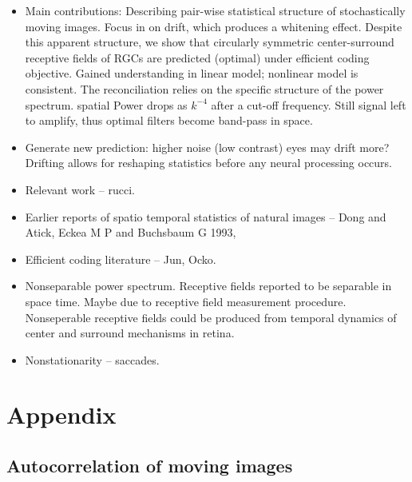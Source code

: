 \documentclass[12pt]{article}
\begin{document}
\begin{itemize}
    \item Main contributions: Describing pair-wise statistical structure of stochastically moving images. Focus in on drift, which produces a whitening effect. Despite this apparent structure, we show that circularly symmetric center-surround receptive fields of RGCs are predicted (optimal) under efficient coding objective. Gained understanding in linear model; nonlinear model is consistent. The reconciliation relies on the specific structure of the power spectrum. spatial Power drops as $k^{-4}$ after a cut-off frequency. Still signal left to amplify, thus optimal filters become band-pass in space. 
    \item Generate new prediction: higher noise (low contrast) eyes may drift more? Drifting allows for reshaping statistics before any neural processing occurs. 
    \item Relevant work -- rucci. 
    \item Earlier reports of spatio temporal statistics of natural images -- Dong and Atick, Eckea M P and Buchsbaum G 1993, 
    \item Efficient coding literature -- Jun, Ocko. 
    \item Nonseparable power spectrum. Receptive fields reported to be separable in space time. Maybe due to receptive field measurement procedure. Nonseperable receptive fields could be produced from temporal dynamics of center and surround mechanisms in retina. 
    \item Nonstationarity -- saccades. 
\end{itemize}

\clearpage

\appendix
\renewcommand{\thefigure}{S\arabic{figure}}
\setcounter{figure}{0}
%
\section{Appendix}

\subsection{Autocorrelation of moving images} \label{sec:app_autocorrelation}
\end{document}
